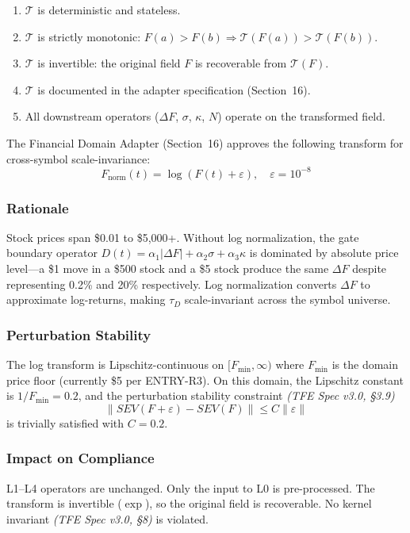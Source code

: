 \documentclass[11pt,a4paper]{article}
\newcommand{\specref}[1]{\textit{(TFE Spec v3.0, \S#1)}}
\begin{document}
\begin{enumerate}[label=(\roman*)]
    \item $\mathcal{T}$ is deterministic and stateless.
    \item $\mathcal{T}$ is strictly monotonic: $F(a) > F(b) \Rightarrow \mathcal{T}(F(a)) > \mathcal{T}(F(b))$.
    \item $\mathcal{T}$ is invertible: the original field $F$ is recoverable from $\mathcal{T}(F)$.
    \item $\mathcal{T}$ is documented in the adapter specification (Section~16).
    \item All downstream operators ($\Delta F$, $\sigma$, $\kappa$, $N$) operate on the transformed field.
\end{enumerate}

The Financial Domain Adapter (Section~16) approves the following transform
for cross-symbol scale-invariance:
\[
    F_{\text{norm}}(t) = \log(F(t) + \varepsilon), \quad \varepsilon = 10^{-8}
\]

\subsubsection*{Rationale}
Stock prices span \$0.01 to \$5{,}000+. Without log normalization, the gate
boundary operator $D(t) = \alpha_1|\Delta F| + \alpha_2\sigma + \alpha_3\kappa$
is dominated by absolute price level---a \$1 move in a \$500 stock and a \$5
stock produce the same $\Delta F$ despite representing 0.2\% and 20\% respectively.
Log normalization converts $\Delta F$ to approximate log-returns, making
$\tau_D$ scale-invariant across the symbol universe.

\subsubsection*{Perturbation Stability}
The log transform is Lipschitz-continuous on $[F_{\min}, \infty)$ where
$F_{\min}$ is the domain price floor (currently \$5 per ENTRY-R3). On this
domain, the Lipschitz constant is $1/F_{\min} = 0.2$, and the perturbation
stability constraint \specref{3.9}
\[
    \|SEV(F + \varepsilon) - SEV(F)\| \leq C\|\varepsilon\|
\]
is trivially satisfied with $C = 0.2$.

\subsubsection*{Impact on Compliance}
L1--L4 operators are unchanged. Only the input to L0 is pre-processed. The
transform is invertible ($\exp$), so the original field is recoverable.
No kernel invariant \specref{8} is violated.
\end{document}
